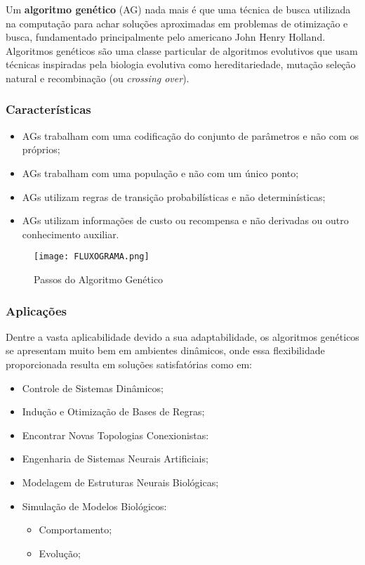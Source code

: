 \documentclass[12pt,a4paper]{article}
\begin{document}
\hspace{4ex}Um \textbf{algoritmo genético} (AG) nada mais é que uma técnica de busca utilizada na computação para achar soluções aproximadas em problemas de otimização e busca, fundamentado principalmente pelo americano John Henry Holland. Algoritmos genéticos são uma classe particular de algoritmos evolutivos que usam técnicas inspiradas pela biologia evolutiva como hereditariedade, mutação seleção natural e recombinação (ou \textit{crossing over}).

\subsubsection{Características}

\begin{itemize}
	\item AGs trabalham com uma codificação do conjunto de parâmetros e não com os próprios;
	\item AGs trabalham com uma população e não com um único ponto;
	\item AGs utilizam regras de transição probabilísticas e não determinísticas;
	\item AGs utilizam informações de custo ou recompensa e não derivadas ou outro conhecimento auxiliar.
\end{itemize}

\begin{figure}[!htb]
	\label{Figura 1}
	\centering
	\caption{Passos do Algoritmo Genético}
	\texttt{[image: FLUXOGRAMA.png]}
\end{figure}

\newpage
\thispagestyle{main}

\subsubsection{Aplicações}

\hspace{4ex}Dentre a vasta aplicabilidade devido a sua adaptabilidade, os algoritmos genéticos se apresentam muito bem em ambientes dinâmicos, onde essa flexibilidade proporcionada resulta em soluções satisfatórias como em:

\begin{itemize}
\item Controle de Sistemas Dinâmicos;
\item Indução e Otimização de Bases de Regras;
\item Encontrar Novas Topologias Conexionistas:
\item Engenharia de Sistemas Neurais Artificiais;
\item Modelagem de Estruturas Neurais Biológicas;
\item Simulação de Modelos Biológicos:
	\begin{itemize}
	\item Comportamento;
	\item Evolução;
	\end{itemize}
\end{itemize}
\end{document}
